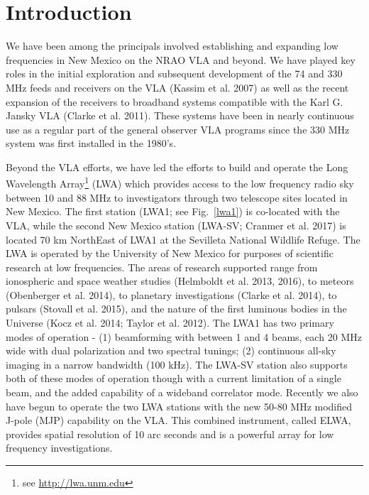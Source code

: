 \documentclass[11pt]{article}
\newcommand{\tododetail}{\todo[inline,color=green!40]}
\begin{document}
\vfill
\eject

%
%

\tableofcontents

\vfill
\eject

\vspace{-0.5cm}
\section{Introduction}
\vspace{-0.25cm}

We have been among the principals involved establishing and expanding low frequencies in New Mexico on the NRAO VLA and beyond. We have played key roles in the initial exploration and subsequent development of the 74 and 330 MHz feeds and receivers on the VLA (Kassim et al. 2007) as well as the recent expansion of the receivers to broadband systems compatible with the Karl G. Jansky VLA (Clarke et al. 2011). These systems have been in nearly continuous use as a regular part of the general observer VLA programs since the 330 MHz system was first installed in the 1980's. 

Beyond the VLA efforts, we have led the efforts to build and operate
the Long Wavelength Array\footnote[1]{\noindent see
  \url{http://lwa.unm.edu}} (LWA) which provides access to the low
frequency radio sky between 10 and 88 MHz to investigators through two
telescope sites located in New Mexico.  The first station (LWA1; see
Fig.~\ref{lwa1}) is co-located with the VLA, while the second New
Mexico station (LWA-SV; Cranmer et al. 2017) is located 70 km
NorthEast of LWA1 at the Sevilleta National Wildlife Refuge.  The LWA
is operated by the University of New Mexico for purposes of scientific
research at low frequencies.  The areas of research supported range
from ionospheric and space weather studies (Helmboldt et al. 2013,
2016), to meteors (Obenberger et al. 2014), to planetary
investigations (Clarke et al. 2014), to pulsars (Stovall et al. 2015),
and the nature of the first luminous bodies in the Universe (Kocz et
al. 2014; Taylor et al. 2012).  The LWA1 has two primary modes of
operation - (1) beamforming with between 1 and 4 beams, each 20 MHz
wide with dual polarization and two spectral tunings; (2) continuous
all-sky imaging in a narrow bandwidth (100 kHz).  The LWA-SV station
also supports both of these modes of operation though with a current
limitation of a single beam, and the added capability of a wideband
correlator mode.  Recently we also have begun to operate the two LWA
stations with the new 50-80 MHz modified J-pole (MJP) capability on
the VLA.  This combined instrument, called ELWA, provides spatial
resolution of 10 arc seconds and is a powerful array for low frequency
investigations.
\end{document}
